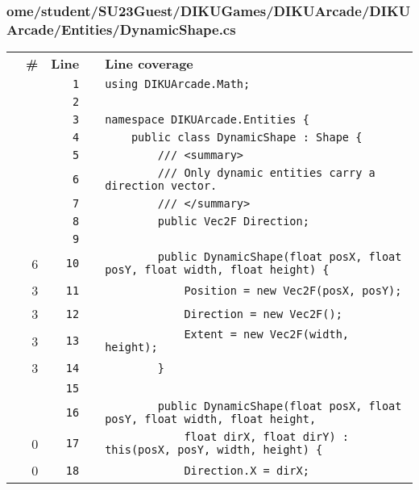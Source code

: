 \documentclass[a4paper,landscape,10pt]{article}
\begin{document}
\subsubsection{ome/student/SU23Guest/DIKUGames/DIKUArcade/DIKUArcade/Entities/DynamicShape.cs}
\begin{longtable}[l]{lrrll}
\textbf{} & \textbf{\#} & \textbf{Line} & \textbf{} & \textbf{Line coverage}\\
\cellcolor{gray} &  & \verb~1~ & & \verb~using DIKUArcade.Math;~\\
\cellcolor{gray} &  & \verb~2~ & & \verb~~\\
\cellcolor{gray} &  & \verb~3~ & & \verb~namespace DIKUArcade.Entities {~\\
\cellcolor{gray} &  & \verb~4~ & & \verb~    public class DynamicShape : Shape {~\\
\cellcolor{gray} &  & \verb~5~ & & \verb~        /// <summary>~\\
\cellcolor{gray} &  & \verb~6~ & & \verb~        /// Only dynamic entities carry a direction vector.~\\
\cellcolor{gray} &  & \verb~7~ & & \verb~        /// </summary>~\\
\cellcolor{gray} &  & \verb~8~ & & \verb~        public Vec2F Direction;~\\
\cellcolor{gray} &  & \verb~9~ & & \verb~~\\
\cellcolor{green} & 6 & \verb~10~ & & \verb~        public DynamicShape(float posX, float posY, float width, float height) {~\\
\cellcolor{green} & 3 & \verb~11~ & & \verb~            Position = new Vec2F(posX, posY);~\\
\cellcolor{green} & 3 & \verb~12~ & & \verb~            Direction = new Vec2F();~\\
\cellcolor{green} & 3 & \verb~13~ & & \verb~            Extent = new Vec2F(width, height);~\\
\cellcolor{green} & 3 & \verb~14~ & & \verb~        }~\\
\cellcolor{gray} &  & \verb~15~ & & \verb~~\\
\cellcolor{gray} &  & \verb~16~ & & \verb~        public DynamicShape(float posX, float posY, float width, float height,~\\
\cellcolor{red} & 0 & \verb~17~ & & \verb~            float dirX, float dirY) : this(posX, posY, width, height) {~\\
\cellcolor{red} & 0 & \verb~18~ & & \verb~            Direction.X = dirX;~\\

\end{longtable}
\end{document}

